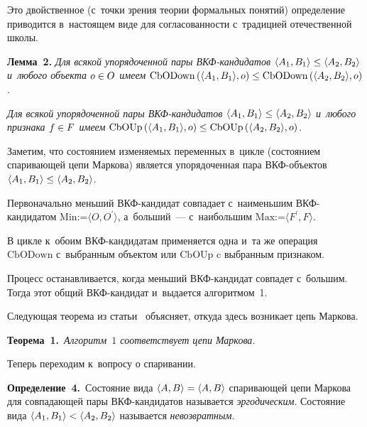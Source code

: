 \begin{multicols}{2}
    Это двойственное (с~точки зрения теории формальных понятий) 
определение приводится в~настоящем виде для согласованности с~традицией 
отечественной школы.
    
    \smallskip
    
    \noindent
   \textbf{Лемма~2.} \textit{Для всякой упорядоченной пары  
ВКФ-кан\-ди\-да\-тов $\langle A_1, B_1\rangle \hm\leq \langle A_2, B_2\rangle$ 
и~любого объекта $o\hm\in O$ имеем} $\mathrm{CbODown}\,(\langle A_1, B_1\rangle, 
o)\hm\leq \mathrm{CbODown}\,(\langle A_2, B_2\rangle, o)$.
    
    \textit{Для всякой упорядоченной пары ВКФ-кан\-ди\-да\-тов $\langle 
A_1, B_1\rangle \hm\leq \langle A_2, B_2\rangle$ и~любого признака $f\hm\in 
F$ имеем} $\mathrm{CbOUp}\,(\langle A_1, B_1\rangle, o)\hm\leq \mathrm{CbOUp}\,(\langle A_2, 
B_2\rangle, o)$. 
    
   
    
    Заметим, что состоянием изменяемых переменных в~цикле (состоянием 
спаривающей цепи Маркова) является упорядоченная пара ВКФ-объ\-ек\-тов 
$\langle A_1, B_1\rangle \hm\leq \langle A_2, B_2\rangle$. 
    
    Первоначально меньший ВКФ-кан\-ди\-дат совпадает с~наименьшим  
ВКФ-кан\-ди\-да\-том $\mathrm{Min}$\;:=\;$\langle O, O^\prime\rangle$, а~больший~--- 
с~наибольшим $\mathrm{Max}$\;:=\;$\langle F^\prime, F\rangle$.
    
    В цикле к~обоим ВКФ-кан\-ди\-да\-там применяется одна и~та же 
операция $\mathrm{CbODown}$ с~выбранным объектом или $\mathrm{CbOUp}$ c выбранным 
признаком.
    
    Процесс останавливается, когда меньший ВКФ-кан\-ди\-дат совпадет 
с~большим. Тогда этот общий ВКФ-кан\-ди\-дат и~выдается алгоритмом~1.
    
    Следующая теорема из статьи~\cite{7-vin} объясняет, откуда здесь 
возникает цепь Маркова.
    
    \smallskip
    
    \noindent
    \textbf{Теорема~1.}\ \textit{Алгоритм~$1$ соответствует цепи 
Мар\-кова.}
    
    \smallskip
    
    Теперь переходим к~вопросу о спаривании.
    
    \smallskip
    
    \noindent
    \textbf{Определение~4.}\ Состояние вида $\langle A, B\rangle \hm= 
\langle A, B\rangle $ спаривающей цепи Маркова для совпадающей пары  
ВКФ-кан\-ди\-да\-тов называется \textit{эргодическим}. Состояние вида 
$\langle A_1, B_1\rangle\hm< \langle A_2, B_2\rangle$ называется 
\textit{невозвратным}.
    

\end{multicols}
